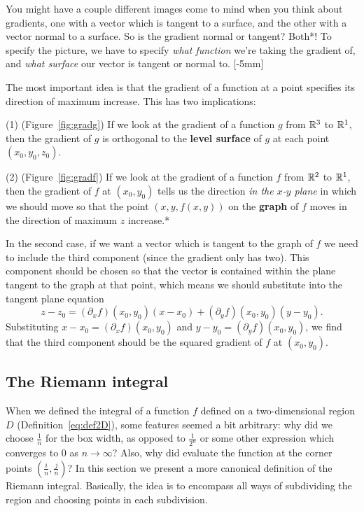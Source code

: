 \documentclass{watsonbook}
\begin{document}
You might have a couple different images come to
mind when you think about gradients, one with a vector which is
tangent to a surface, and the other with a vector normal to a
surface. So is the gradient normal or tangent? Both*! To specify the
picture, we have to specify \textit{what function} we're
taking the gradient of, and \textit{what surface} our vector is tangent or
normal to. 
[-5mm]

The most important idea is that the gradient of a function at a point
specifies its direction of maximum increase. This has two
implications:

(1) (Figure~\ref{fig:gradg}) If we look at the gradient of a function
$g$ from $\mathbb{R}^3$ to $\mathbb{R}^1$, then the gradient of $g$ is orthogonal to
the \textbf{level surface} of $g$ at each point $(x_0,y_0,z_0)$.

(2) (Figure~\ref{fig:gradf}) If we look at the gradient of a function
$f$ from $\mathbb{R}^2$ to $\mathbb{R}^1$, then the gradient of $f$ at $(x_0,y_0)$
tells us the direction \textit{in the $x$-$y$ plane} in which we
should move so that the point $(x,y,f(x,y))$ on the \textbf{graph} of
$f$ moves in the direction of maximum $z$ increase.* 

In the second case, if we want a vector which is tangent to the graph
of $f$ we need to include the third component (since the gradient only
has two). This component should be chosen so that the vector is
contained within the plane tangent to the graph at that point, which
means we should substitute into the tangent plane equation
\[
  z - z_0 = (\partial_x f)(x_0,y_0)(x-x_0) +  (\partial_y
  f)(x_0,y_0)(y-y_0). 
\]
Substituting $x-x_0 = (\partial_x f)(x_0,y_0)$ and $y-y_0 =
(\partial_y f)(x_0,y_0)$, we find that the third component should be
the squared gradient of $f$ at $(x_0,y_0)$.

\newpage

\subsection{The Riemann integral} \label{sec:riemannintegral} 

When we defined the integral of a function $f$ defined on a
two-dimensional region $D$ (Definition~\ref{eq:def2D}), some features
seemed a bit arbitrary: why did we choose $\tfrac1n$ for the box
width, as opposed to $\tfrac1{2^n}$ or some other expression which
converges to 0 as $n\to\infty$? Also, why did evaluate the function at
the corner points $\left(\tfrac in, \tfrac jn\right)$? In this section
we present a more canonical definition of the Riemann
integral. Basically, the idea is to encompass all ways of subdividing
the region and choosing points in each subdivision.
\end{document}
